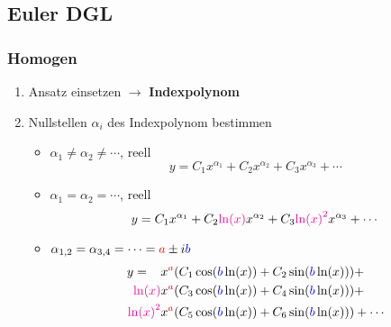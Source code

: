 \subsection{Euler DGL}
    \subsubsection{Homogen}\label{sec:Euler-homogen}
        \vspace{0.5em}
        \begin{enumerate}
            \item Ansatz  einsetzen $\to$ \textbf{Indexpolynom}
            \item Nullstellen $\alpha_i$ des Indexpolynom bestimmen
            \begin{itemize}
                \item $\alpha_1 \neq \alpha_2 \neq \cdots$, reell
                    $$
                        y = C_1 x^{\alpha_1} + C_2 x^{\alpha_2} + C_3 x^{\alpha_3}+ \cdots
                    $$
                \item $\alpha_1 = \alpha_2 = \cdots$, reell
                    $$
                        y = C_1 x^{\alpha_1} + C_2 {\color{magenta} \ln(x)} x^{\alpha_2} + C_3 {\color{magenta} \ln(x)^2} x^{\alpha_3} + \cdots
                    $$
                \item $\alpha_{1,2} = \alpha_{3,4} = \cdots = {\color{red}a} \pm i {\color{blue}b}$
                    \begin{align*}
                        y =\phantom{\ln} &x^{{\color{red}a}} (C_1 \cos({\color{blue}b} \ln(x)) + C_2 \sin({\color{blue}b} \ln(x))) +\\
                            {\color{magenta} \ln(x)}&x^{{\color{red}a}} (C_3 \cos({\color{blue}b} \ln(x)) + C_4 \sin({\color{blue}b} \ln(x)))+\\
                            {\color{magenta} \ln(x)^2}&x^{{\color{red}a}} (C_5 \cos({\color{blue}b} \ln(x)) + C_6 \sin({\color{blue}b} \ln(x)))+ \cdots
                    \end{align*}
            \end{itemize}
        \end{enumerate}
